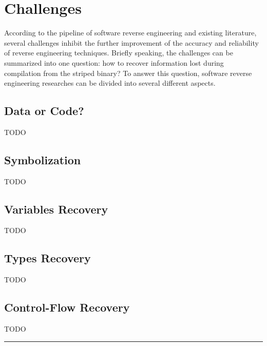\chapter{Challenges}\label{sec-challenges}

According to the pipeline of software reverse engineering and existing literature, several challenges inhibit the further improvement of the accuracy and reliability of reverse engineering techniques. Briefly speaking, the challenges can be summarized into one question: how to recover information lost during compilation from the striped binary? To answer this question, software reverse engineering researches can be divided into several different aspects.

\section{Data or Code?} \label{sec:challenges-data-or-code}
TODO

\section{Symbolization} \label{sec:challenges-symbol}
TODO

\section{Variables Recovery} \label{sec:challenges-variable}
TODO

\section{Types Recovery} \label{sec:challenges-types}
TODO

\section{Control-Flow Recovery} \label{sec:challenges-control-flow}
TODO

\noindent\rule{8cm}{0.4pt}

\newpage
